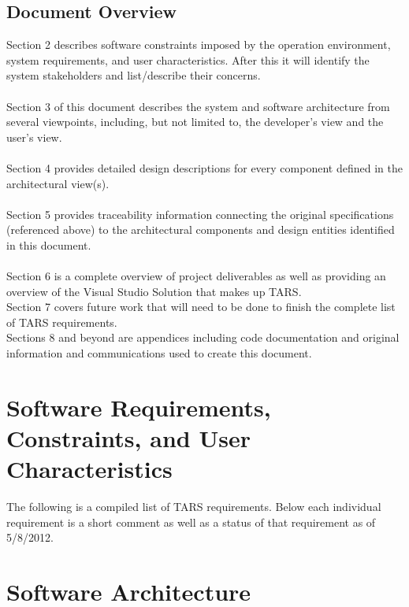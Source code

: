 \documentclass[letterpaper]{article}
\begin{document}
\subsection{\bfseries{Document Overview}}
Section 2 describes software constraints imposed by the operation environment, system requirements, and user characteristics. After this it will identify the system stakeholders and list/describe their concerns.  \\
\\
Section 3 of this document describes the system and software
architecture from several viewpoints, including, but not limited to,
the developer{\textquoteright}s view and the user{\textquoteright}s
view.\\
\\
Section 4 provides detailed design descriptions for every component
defined in the architectural view(s). \\
\\
Section 5 provides traceability information connecting the original specifications
(referenced above) to the architectural components and design entities identified in this document.\\
\\
Section 6 is a complete overview of project deliverables as well as providing an overview of the Visual Studio Solution that makes up TARS.
\\
Section 7 covers future work that will need to be done to finish the complete list of TARS requirements.
\\
Sections 8 and beyond are appendices including code documentation and original information and communications used to create this document.

\section{\bfseries{Software Requirements, Constraints, and User Characteristics}}
The following is a compiled list of TARS requirements. Below each individual requirement is a short comment as well as a status of that requirement as of 5/8/2012.


\section{Software Architecture}
\end{document}
